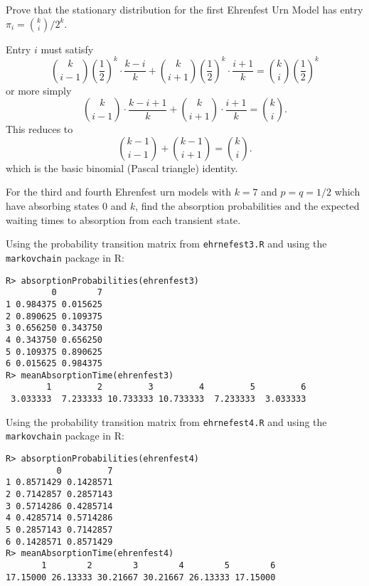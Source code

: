 \documentclass[12pt]{article}
\begin{document}
\begin{exercise}
    Prove that the stationary distribution for the first Ehrenfest Urn
    Model has entry \( \pi_i = \binom{k}{i}/2^k \).
\end{exercise}

\begin{solution}
    Entry \( i \) must satisfy
    \[
        \binom{k}{i-1}\left( \frac{1}{2} \right)^k \cdot \frac{k-i}{k} +
        \binom{k}{i+1}\left( \frac{1}{2} \right)^k \cdot \frac{i+1}{k} =
        \binom{k}{i}\left( \frac{1}{2} \right)^k
    \] or more simply
    \[
        \binom{k}{i-1} \cdot \frac{k-i+1}{k} + \binom{k}{i+1} \cdot
        \frac{i+1}{k} = \binom{k}{i}.
    \] This reduces to
    \[
        \binom{k-1}{i-1} + \binom{k-1}{i+1} = \binom{k}{i}.
    \] which is the basic binomial (Pascal triangle) identity.
\end{solution}

\begin{exercise}
    For the third and fourth Ehrenfest urn models with \( k = 7 \) and \(
    p = q = 1/2 \) which have absorbing states \( 0 \) and \( k \), find
    the absorption probabilities and the expected waiting times to
    absorption from each transient state.
\end{exercise}
\begin{solution}
    Using the probability transition matrix from \texttt{ehrnefest3.R}
    and using the \texttt{markovchain} package in R\@:
\begin{verbatim}
R> absorptionProbabilities(ehrenfest3)
         0        7
1 0.984375 0.015625
2 0.890625 0.109375
3 0.656250 0.343750
4 0.343750 0.656250
5 0.109375 0.890625
6 0.015625 0.984375
R> meanAbsorptionTime(ehrenfest3)
        1         2         3         4         5         6 
 3.033333  7.233333 10.733333 10.733333  7.233333  3.033333 
\end{verbatim}

    Using the probability transition matrix from \texttt{ehrnefest4.R}
    and using the \texttt{markovchain} package in R\@:
\begin{verbatim}
R> absorptionProbabilities(ehrenfest4)
          0         7
1 0.8571429 0.1428571
2 0.7142857 0.2857143
3 0.5714286 0.4285714
4 0.4285714 0.5714286
5 0.2857143 0.7142857
6 0.1428571 0.8571429
R> meanAbsorptionTime(ehrenfest4)
       1        2        3        4        5        6 
17.15000 26.13333 30.21667 30.21667 26.13333 17.15000 
\end{verbatim}
\end{solution}
\end{document}
